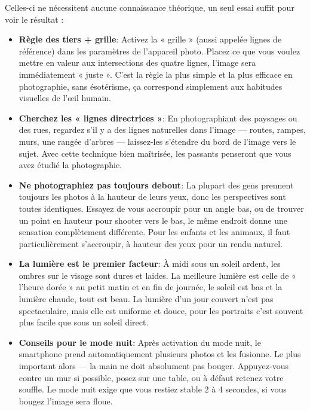 Celles-ci ne nécessitent aucune connaissance théorique, un seul essai suffit pour voir le résultat :

\begin{itemize}
  \item \textbf{Règle des tiers + grille}: Activez la « grille » (aussi appelée lignes de référence) dans les paramètres de l'appareil photo. Placez ce que vous voulez mettre en valeur aux intersections des quatre lignes, l'image sera immédiatement « juste ». C'est la règle la plus simple et la plus efficace en photographie, sans ésotérisme, ça correspond simplement aux habitudes visuelles de l'œil humain.
  \item \textbf{Cherchez les « lignes directrices »}: En photographiant des paysages ou des rues, regardez s'il y a des lignes naturelles dans l'image — routes, rampes, murs, une rangée d'arbres — laissez-les s'étendre du bord de l'image vers le sujet. Avec cette technique bien maîtrisée, les passants penseront que vous avez étudié la photographie.
  \item \textbf{Ne photographiez pas toujours debout}: La plupart des gens prennent toujours les photos à la hauteur de leurs yeux, donc les perspectives sont toutes identiques. Essayez de vous accroupir pour un angle bas, ou de trouver un point en hauteur pour shooter vers le bas, le même endroit donne une sensation complètement différente. Pour les enfants et les animaux, il faut particulièrement s'accroupir, à hauteur des yeux pour un rendu naturel.
  \item \textbf{La lumière est le premier facteur}: À midi sous un soleil ardent, les ombres sur le visage sont dures et laides. La meilleure lumière est celle de « l'heure dorée » au petit matin et en fin de journée, le soleil est bas et la lumière chaude, tout est beau. La lumière d'un jour couvert n'est pas spectaculaire, mais elle est uniforme et douce, pour les portraits c'est souvent plus facile que sous un soleil direct.
  \item \textbf{Conseils pour le mode nuit}: Après activation du mode nuit, le smartphone prend automatiquement plusieurs photos et les fusionne. Le plus important alors — la main ne doit absolument pas bouger. Appuyez-vous contre un mur si possible, posez sur une table, ou à défaut retenez votre souffle. Le mode nuit exige que vous restiez stable 2 à 4 secondes, si vous bougez l'image sera floue.
\end{itemize}


